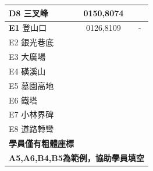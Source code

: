 \documentclass{article}
\begin{document}
\begin{CJK*}{UTF8}{bkai}
\begin{multicols}{2}
\begin{tabular}{|l|c|l|}
	\textbf{D8} 三叉峰&0150,8074&\\
	\hline
	\textbf{E1} 登山口&0126,8109&-\\
	E2 銀光巷底& &\\
	E3 大廣場& &\\
	E4 磺溪山& &\\
	E5 墓園高地& &\\
	E6 鐵塔& &\\
	E7 小林界碑& &\\
	E8 道路轉彎& &\\
	\hline
	\multicolumn{3}{l}{\textbf{學員僅有粗體座標}}\\
	\multicolumn{3}{l}{\textbf{A5,A6,B4,B5為範例，協助學員填空}}
\end{tabular}
\end{multicols}
\end{CJK*}
\end{document}
